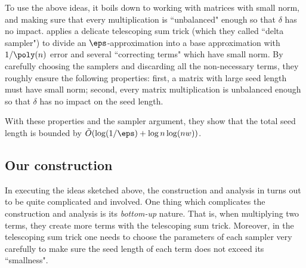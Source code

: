 To use the above ideas, it boils down to working with matrices with small norm, and  making sure that every multiplication is ``unbalanced" enough so that $\delta$ has no impact. \cite{BCG18} applies a delicate telescoping sum trick (which they called ``delta sampler") to divide an $\eps$-approximation into a base approximation with $1/\poly(n)$ error and several ``correcting terms" which have small norm. By carefully choosing the samplers and discarding all the non-necessary terms,  they roughly ensure the following properties: first, a matrix with large seed length must have small norm; second, every matrix multiplication is unbalanced enough so that $\delta$ has no impact on the seed length. 


With these properties and the sampler argument, they show that the total seed length is bounded by $\tilde{O}(\log(1/\eps)+\log n \log(nw))$.

\subsection{Our construction}\label{sec:our-const}
In executing the ideas sketched above,  the construction and analysis in \cite{BCG18} turns out to be quite complicated and involved. One thing which complicates the construction and analysis is its \emph{bottom-up} nature. That is, when multiplying two terms, they create more terms with the telescoping sum trick. Moreover, in the telescoping sum trick one needs to choose the parameters of each sampler very carefully to make sure the seed length of each term does not exceed its ``smallness". 


